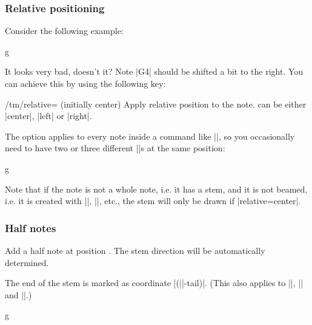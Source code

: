 \subsubsection{Relative positioning}\label{sec:music-notes:commands:relative}
Consider the following example:
\begin{codeexample}[]
\begin{tmline}
\begin{tmstaff}{g}{}
\end{tmstaff}
\end{tmline}
\end{codeexample}
It looks very bad, doesn't it? Note |G4| should be shifted a bit to the right. 
You can achieve this by using the following key:
\begin{key}{/tm/relative= (initially center)}
  Apply relative position to the note.  can be either 
  |center|, |left| or |right|.
\end{key}
The option applies to every note inside a command like |\tmwhole|, so you 
occasionally need to have two or three different |\tmwhole|s at the same position:
\begin{codeexample}[]
\begin{tmline}
\begin{tmstaff}{g}{}
\end{tmstaff}
\end{tmline}
\end{codeexample}
Note that if the note is not a whole note, i.e. it has a stem, and it is not 
beamed, i.e. it is created with |\tmhalf|, |\tmquarter|, etc., the stem will only 
be drawn if |relative=center|.
\subsubsection{Half notes}\label{sec:music-notes:commands:half}
\begin{command}{\tmhalf{}}
  Add a half note at position . The stem direction will be automatically 
  determined.
\end{command}
The end of the stem is marked as coordinate |(||-tail)|. (This also 
applies to |\tmquarter|, |\tmeighth| and |\tmmorethaneighth|.)
\begin{codeexample}[]
\begin{tmline}%
\begin{tmstaff}{g}{}
        
     
              
       
\end{tmstaff}%
\end{tmline}
\end{codeexample}
